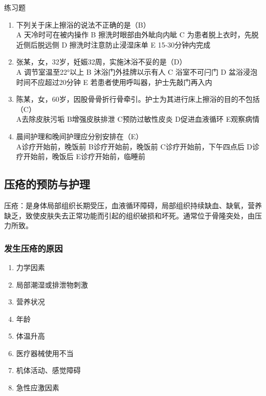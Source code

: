 \documentclass[11pt, a4paper]{ctexart}
\begin{document}
\begin{examplebox}{练习题}
\begin{enumerate}
    \item 下列关于床上擦浴的说法不正确的是（B）\\
    A 天冷时可在被内操作 \quad B 擦洗时眼部由外眦向内眦 \quad C 为患者脱上衣时，先脱近侧后脱远侧 \quad D 擦洗时注意防止浸湿床单 \quad E 15-30分钟内完成
    \item 张某，女，32岁，妊娠32周，实施沐浴不妥的是（D）\\
    A 调节室温至22°以上 \quad B 沐浴门外挂牌以示有人 \quad C 浴室不可闩门 \quad D 盆浴浸泡时间不应超过20分钟 \quad E 若患者使用呼叫器，护士先敲门再入内
    \item 陈某，女，60岁，因股骨骨折行骨牵引。护士为其进行床上擦浴的目的不包括（C）\\
    A去除皮肤污垢 \quad B增强皮肤排泄 \quad C预防过敏性皮炎 \quad D促进血液循环 \quad E观察病情
    \item 晨间护理和晚间护理应分别安排在（E）\\
    A诊疗开始前，晚饭前 \quad B诊疗开始前，晚饭前 \quad C诊疗开始前，下午四点后 \quad D诊疗开始前，晚饭后 \quad E诊疗开始前，临睡前
\end{enumerate}
\end{examplebox}

\subsection{压疮的预防与护理}
压疮：是身体局部组织长期受压，血液循环障碍，局部组织持续缺血、缺氧，营养缺乏，致使皮肤失去正常功能而引起的组织破损和坏死。通常位于骨隆突处，由压力所致。

\subsubsection{发生压疮的原因}
\begin{enumerate}
    \item 力学因素
    \item 局部潮湿或排泄物刺激
    \item 营养状况
    \item 年龄
    \item 体温升高
    \item 医疗器械使用不当
    \item 机体活动、感觉障碍
    \item 急性应激因素
\end{enumerate}
\end{document}
